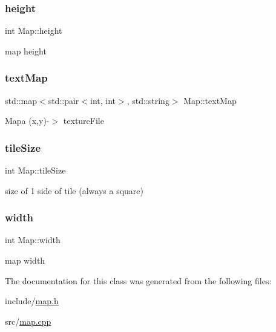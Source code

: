 \subsubsection{\texorpdfstring{height}{height}}
{\footnotesize\ttfamily int Map\+::height\hspace{0.3cm}{\ttfamily [private]}}

map height \mbox{\label{classMap_ae2bfd5c888983cc73be6d9a4c3ad1bcf}} 
\subsubsection{\texorpdfstring{text\+Map}{textMap}}
{\footnotesize\ttfamily std\+::map$<$std\+::pair$<$int, int$>$, std\+::string$>$ Map\+::text\+Map\hspace{0.3cm}{\ttfamily [private]}}

Mapa (x,y)-\/$>$ texture\+File \mbox{\label{classMap_ae686445a21a02aaf586633c5a69e8ff3}} 
\subsubsection{\texorpdfstring{tile\+Size}{tileSize}}
{\footnotesize\ttfamily int Map\+::tile\+Size\hspace{0.3cm}{\ttfamily [private]}}

size of 1 side of tile (always a square) \mbox{\label{classMap_a9ecfe932ad2d2bc22492416033bdacfd}} 
\subsubsection{\texorpdfstring{width}{width}}
{\footnotesize\ttfamily int Map\+::width\hspace{0.3cm}{\ttfamily [private]}}

map width 

The documentation for this class was generated from the following files\+:\begin{DoxyCompactItemize}
\item 
include/\hyperlink{map_8h}{map.\+h}\item 
src/\hyperlink{map_8cpp}{map.\+cpp}\end{DoxyCompactItemize}
